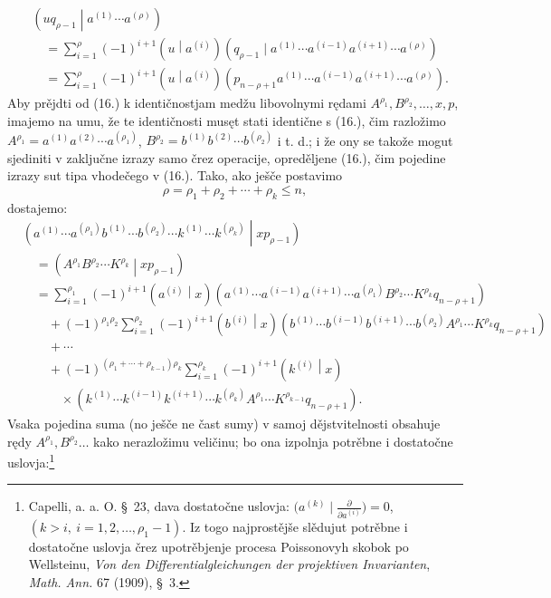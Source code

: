 \documentclass[11pt]{article}
\newcommand{\pair}[2]{\left(#1\middle|#2\right)}
\begin{document}
\begin{equation}
\begin{aligned}
&\pair{u q_{\rho-1}}{a^{(1)}\cdots a^{(\rho)}}\\
&\quad=\sum_{i=1}^{\rho}(-1)^{i+1}\pair{u}{a^{(i)}}
(q_{\rho-1}\mid a^{(1)}\cdots a^{(i-1)}a^{(i+1)}\cdots a^{(\rho)})\\
&\quad=\sum_{i=1}^{\rho}(-1)^{i+1}\pair{u}{a^{(i)}}
(p_{n-\rho+1}a^{(1)}\cdots a^{(i-1)}a^{(i+1)}\cdots a^{(\rho)}).
\end{aligned}
\tag{17}
\end{equation}
Aby prějdti od (16.) k identičnostjam medžu libovolnymi rędami $A^{\rho_1},B^{\rho_2},\ldots,x,p$, imajemo na umu, že te identičnosti musęt stati identične s (16.), čim razložimo $A^{\rho_1}=a^{(1)}a^{(2)}\cdots a^{(\rho_1)}$, $B^{\rho_2}=b^{(1)}b^{(2)}\cdots b^{(\rho_2)}$ i t. d.; i že ony se takože mogut sjediniti v zaključne izrazy samo črez operacije, opreděljene (16.), čim pojedine izrazy sut tipa vhodečego v (16.). Tako, ako ješče postavimo
\begin{equation}
 \rho=\rho_1+\rho_2+\cdots+\rho_k\le n,
\tag{18}
\end{equation}
dostajemo:
\[
\begin{aligned}
&\pair{a^{(1)}\cdots a^{(\rho_1)}b^{(1)}\cdots b^{(\rho_2)}
\cdots k^{(1)}\cdots k^{(\rho_k)}}{xp_{\rho-1}}\\
&\quad=\pair{A^{\rho_1}B^{\rho_2}\cdots K^{\rho_k}}{xp_{\rho-1}} \\
&\quad=\sum_{i=1}^{\rho_1}(-1)^{i+1}\pair{a^{(i)}}{x}
(a^{(1)}\cdots a^{(i-1)}a^{(i+1)}\cdots a^{(\rho_1)}
B^{\rho_2}\cdots K^{\rho_k}q_{n-\rho+1})\\
&\qquad+(-1)^{\rho_1\rho_2}\sum_{i=1}^{\rho_2}(-1)^{i+1}\pair{b^{(i)}}{x}
(b^{(1)}\cdots b^{(i-1)}b^{(i+1)}\cdots b^{(\rho_2)}
A^{\rho_1}\cdots K^{\rho_k}q_{n-\rho+1})\\
&\qquad+\cdots\\
&\qquad+(-1)^{(\rho_1+\cdots+\rho_{k-1})\rho_k}
\sum_{i=1}^{\rho_k}(-1)^{i+1}\pair{k^{(i)}}{x}\\
&\qquad\quad\times
(k^{(1)}\cdots k^{(i-1)}k^{(i+1)}\cdots k^{(\rho_k)}
A^{\rho_1}\cdots K^{\rho_{k-1}}q_{n-\rho+1}).
\end{aligned}
\]
Vsaka pojedina suma (no ješče ne čast sumy) v samoj dějstvitelnosti obsahuje rędy $A^{\rho_1},B^{\rho_2}\ldots$ kako nerazložimu veličinu; bo ona izpolnja potrěbne i dostatočne uslovja:\footnote{Capelli, a. a. O. \S\ 23, dava dostatočne uslovja: $\bigl(a^{(k)}\mid \frac{\partial}{\partial a^{(i)}}\bigr)=0$, $(k>i,\ i=1,2,\ldots,\rho_1-1)$. Iz togo najprostějše slědujut potrěbne i dostatočne uslovja črez upotrěbjenje procesa Poissonovyh skobok po Wellsteinu, \emph{Von den Differentialgleichungen der projektiven Invarianten}, \emph{Math. Ann.} 67 (1909), \S\ 3.}
\end{document}
